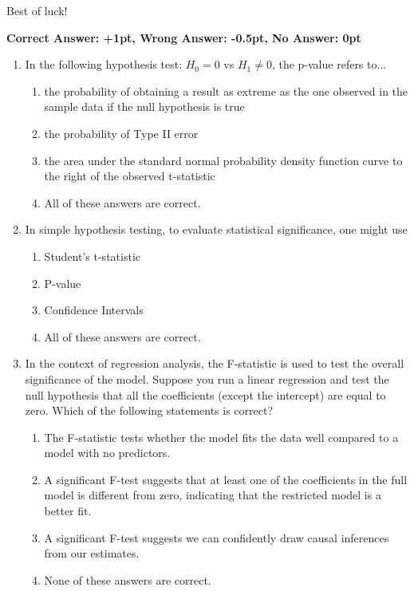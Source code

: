 \documentclass{article}
\begin{document}
\vspace{1cm}

Best of luck!


\newpage

{\large \textbf{Correct Answer: +1pt, Wrong Answer: -0.5pt, No Answer: 0pt}}\\[1em]


\begin{enumerate}



\item In the following hypothesis test: $H_0 = 0$ vs $H_1 \neq 0$, the p-value refers to...

\begin{enumerate}[label=\alph*)]
\item the probability of obtaining a result as extreme as the one observed in the sample data if the null hypothesis is true
\item the probability of Type II error
\item the area under the standard normal probability density function curve to the right of the observed t-statistic
\item All of these answers are correct.
\end{enumerate}\vspace{.25cm}


\item In simple hypothesis testing, to evaluate statistical significance, one might use

\begin{enumerate}[label=\alph*)]
\item Student's t-statistic
\item P-value
\item Confidence Intervals
\item All of these answers are correct.
\end{enumerate}\vspace{.25cm}


\item In the context of regression analysis, the F-statistic is used to test the overall significance of the model. Suppose you run a linear regression and test the null hypothesis that all the coefficients (except the intercept) are equal to zero. Which of the following statements is correct?

\begin{enumerate}[label=\alph*)]
\item The F-statistic tests whether the model fits the data well compared to a model with no predictors.
\item A significant F-test suggests that at least one of the coefficients in the full model is different from zero, indicating that the restricted model is a better fit.
\item A significant F-test suggests we can confidently draw causal inferences from our estimates.
\item None of these answers are correct.
\end{enumerate}\vspace{.25cm}



\end{enumerate}
\end{document}
